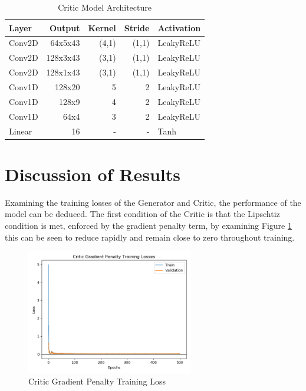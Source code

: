 \begin{table}[h!]
\centering
    \begin{tabular}{ l | r | r | r | l}
    \textbf{Layer} & \textbf{Output} & \textbf{Kernel} & \textbf{Stride} & \textbf{Activation} \\ \hline
    Conv2D & 64x5x43   & (4,1) & (1,1) & LeakyReLU \\ \hline
    Conv2D & 128x3x43  & (3,1) & (1,1) & LeakyReLU \\ \hline
    Conv2D & 128x1x43  & (3,1) & (1,1) & LeakyReLU \\ \hline
    Conv1D & 128x20    & 5     & 2     & LeakyReLU \\ \hline
    Conv1D & 128x9     & 4     & 2     & LeakyReLU \\ \hline
    Conv1D & 64x4      & 3     & 2     & LeakyReLU \\ \hline
    Linear & 16        & -     & -     & Tanh      
    \end{tabular} 
    \caption{Critic Model Architecture}\label{table:gan_critic_arch}
\end{table}

\section{Discussion of Results}
Examining the training losses of the Generator and Critic, the performance of the model can be deduced.
The first condition of the Critic is that the Lipschtiz condition is met, enforced by the gradient penalty term, by examining Figure \ref{fig:gan_critic_gp} this can be seen to reduce rapidly and remain close to zero throughout training.

\begin{figure}[h!]
    \centering
        \includegraphics[width=0.65\textwidth]{figures/gan/critic_gp_train_losses.png}
    \caption{Critic Gradient Penalty Training Loss}\label{fig:gan_critic_gp}
\end{figure} 

